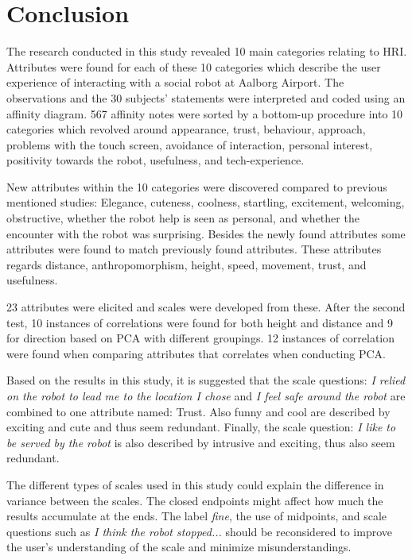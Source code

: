 \section{Conclusion}
\label{Conclusion}
%
The research conducted in this study revealed 10 main categories relating to HRI. Attributes were found for each of these 10 categories which describe the user experience of interacting with a social robot at Aalborg Airport. The observations and the 30 subjects' statements were interpreted and coded using an affinity diagram. 567 affinity notes were sorted by a bottom-up procedure into 10 categories which revolved around appearance, trust, behaviour, approach, problems with the touch screen, avoidance of interaction, personal interest, positivity towards the robot, usefulness, and tech-experience.

New attributes within the 10 categories were discovered compared to previous mentioned studies: Elegance, cuteness, coolness, startling, excitement, welcoming, obstructive, whether the robot help is seen as personal, and whether the encounter with the robot was surprising. Besides the newly found attributes some attributes were found to match previously found attributes. These attributes regards distance, anthropomorphism, height, speed, movement, trust, and usefulness.

23 attributes were elicited and scales were developed from these. After the second test, 10 instances of correlations were found for both height and distance and 9 for direction based on PCA with different groupings. 12 instances of correlation were found when comparing attributes that correlates when conducting PCA.

Based on the results in this study, it is suggested that the scale questions: \textit{I relied on the robot to lead me to the location I chose} and \textit{I feel safe around the robot} are combined to one attribute named: Trust. Also funny and cool are described by exciting and cute and thus seem redundant. Finally, the scale question: \textit{I like to be served by the robot} is also described by intrusive and exciting, thus also seem redundant.

The different types of scales used in this study could explain the difference in variance between the scales. The closed endpoints might affect how much the results accumulate at the ends. The label \textit{fine}, the use of midpoints, and scale questions such as \textit{I think the robot stopped...} should be reconsidered to improve the user's understanding of the scale and minimize misunderstandings. 

